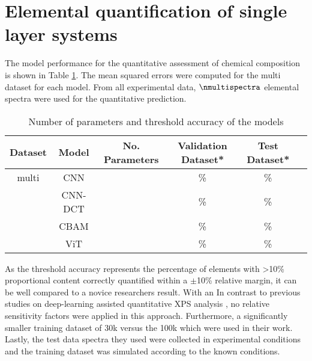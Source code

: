\section{Elemental quantification of single layer systems}

The model performance for the quantitative assessment of chemical composition is shown in Table \ref{tab:acc_quant}. The mean squared errors were computed for the multi dataset for each model.
From all experimental data, $\nmultispectra$ elemental spectra were used for the quantitative prediction. 

\begin{table}[H]
    \centering
    \begin{tabular}{c|c|c|c|c|c}
       Dataset & Model   & No. Parameters & Validation Dataset*  & Test Dataset*    \\
        \hline
        multi  & CNN     &                &        \%             &               \% \\
               & CNN-DCT &                &       \%              &                \% \\
               & CBAM    &                &       \%              &                \% \\
               & ViT     &                &       \%              &                \% \\
    \end{tabular}
    \caption{Number of parameters and threshold accuracy of the models}
    \label{tab:acc_quant}
\end{table}

As the threshold accuracy represents the percentage of elements with >10\% proportional content correctly quantified within a $\pm$10\% relative margin, it can be well compared to a novice researchers result. With an  
In contrast to previous studies on deep-learning assisted quantitative XPS analysis \cite{drera_deep_2019}, no relative sensitivity factors were applied in this approach. Furthermore, a significantly smaller training dataset of 30k versus the 100k which were used in their work. Lastly, the test data spectra they used were collected in experimental conditions and the training dataset was simulated according to the known conditions.

